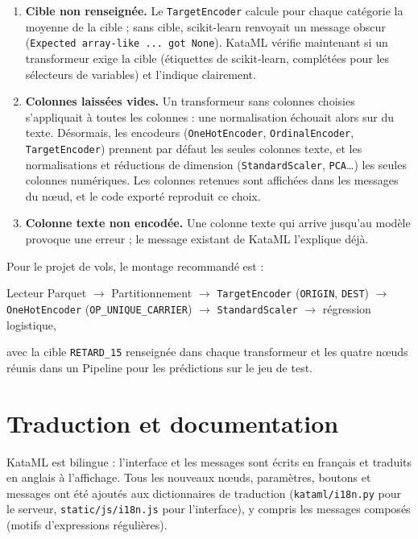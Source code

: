 \documentclass[11pt,a4paper]{article}
\newcommand{\code}[1]{\texttt{#1}}
\begin{document}
\begin{enumerate}
  \item \textbf{Cible non renseignée.} Le \code{TargetEncoder} calcule pour chaque
        catégorie la moyenne de la cible ; sans cible, scikit-learn renvoyait un message
        obscur (\code{Expected array-like ... got None}). KataML vérifie maintenant si un
        transformeur exige la cible (étiquettes de scikit-learn, complétées pour les
        sélecteurs de variables) et l'indique clairement.
  \item \textbf{Colonnes laissées vides.} Un transformeur sans colonnes choisies
        s'appliquait à toutes les colonnes : une normalisation échouait alors sur du
        texte. Désormais, les encodeurs (\code{OneHotEncoder}, \code{OrdinalEncoder},
        \code{TargetEncoder}) prennent par défaut les seules colonnes texte, et les
        normalisations et réductions de dimension (\code{StandardScaler}, \code{PCA}…) les
        seules colonnes numériques. Les colonnes retenues sont affichées dans les
        messages du nœud, et le code exporté reproduit ce choix.
  \item \textbf{Colonne texte non encodée.} Une colonne texte qui arrive jusqu'au modèle
        provoque une erreur ; le message existant de KataML l'explique déjà.
\end{enumerate}

Pour le projet de vols, le montage recommandé est :
\begin{center}
\small
Lecteur Parquet $\rightarrow$ Partitionnement $\rightarrow$
\code{TargetEncoder} (\code{ORIGIN}, \code{DEST}) $\rightarrow$
\code{OneHotEncoder} (\code{OP\_UNIQUE\_CARRIER}) $\rightarrow$
\code{StandardScaler} $\rightarrow$ régression logistique,
\end{center}
avec la cible \code{RETARD\_15} renseignée dans chaque transformeur et les quatre nœuds
réunis dans un Pipeline pour les prédictions sur le jeu de test.

\section{Traduction et documentation}

KataML est bilingue : l'interface et les messages sont écrits en français et traduits
en anglais à l'affichage. Tous les nouveaux nœuds, paramètres, boutons et messages ont
été ajoutés aux dictionnaires de traduction (\code{kataml/i18n.py} pour le serveur,
\code{static/js/i18n.js} pour l'interface), y compris les messages composés (motifs
d'expressions régulières).
\end{document}
